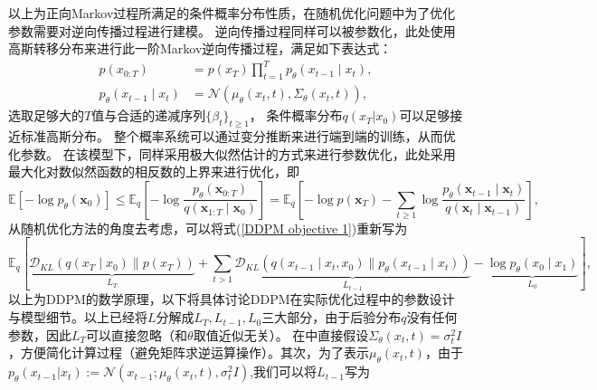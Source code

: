 以上为正向Markov过程所满足的条件概率分布性质，在随机优化问题中为了优化参数需要对逆向传播过程进行建模。
逆向传播过程同样可以被参数化，此处使用高斯转移分布来进行此一阶Markov逆向传播过程，满足如下表达式：
\begin{align}
    p\left(x_{0: T}\right)&=p\left(x_T\right) \prod_{t=1}^T p_\theta\left(x_{t-1} \mid x_t\right),\\
        p_\theta\left(x_{t-1} \mid x_t\right)&=\mathcal{N}\left(\mu_\theta\left(x_t, t\right), \Sigma_\theta\left(x_t, t\right)\right),
        \end{align}
选取足够大的$T$值与合适的递减序列$\{\beta_t\}_{t\geq 1}$， 条件概率分布$q(x_{T}|x_0)$可以足够接近标准高斯分布。
整个概率系统可以通过变分推断来进行端到端的训练，从而优化参数。
在该模型下，同样采用极大似然估计的方式来进行参数优化，此处采用最大化对数似然函数的相反数的上界来进行优化，即
\begin{equation}
    \mathbb{E}\left[-\log p_\theta\left(\mathbf{x}_0\right)\right] \leq \mathbb{E}_q\left[-\log \frac{p_\theta\left(\mathbf{x}_{0: T}\right)}{q\left(\mathbf{x}_{1: T} \mid \mathbf{x}_0\right)}\right]=\mathbb{E}_q\left[-\log p\left(\mathbf{x}_T\right)-\sum_{t \geq 1} \log \frac{p_\theta\left(\mathbf{x}_{t-1} \mid \mathbf{x}_t\right)}{q\left(\mathbf{x}_t \mid \mathbf{x}_{t-1}\right)}\right],
    \label{DDPM objective 1}
\end{equation}
从随机优化方法的角度去考虑，可以将式(\ref{DDPM objective 1})重新写为
\begin{equation}
\mathbb{E}_q[\underbrace{\mathcal{D}_{K L}\left(q\left(x_T \mid x_0\right) \| p\left(x_T\right)\right)}_{L_T}+\sum_{t>1} \underbrace{\mathcal{D}_{K L}\left(q\left(x_{t-1} \mid x_t, x_0\right) \| p_\theta\left(x_{t-1} \mid x_t\right)\right)}_{L_{t-1}}-\underbrace{\log p_\theta\left(x_0 \mid x_1\right)}_{L_0}],
    \end{equation}
以上为DDPM的数学原理，以下将具体讨论DDPM在实际优化过程中的参数设计与模型细节。以上已经将$L$分解成$L_T,L_{t-1},L_0$三大部分，由于后验分布$q$没有任何参数，因此$L_T$可以直接忽略（和$\theta$取值近似无关）。
在\cite{DDPM}中直接假设$\Sigma_{\theta}(x_t,t)=\sigma_t^2 I$，方便简化计算过程（避免矩阵求逆运算操作）。其次，为了表示$\mu_{\theta}(x_t,t)$，由于$p_{\theta}(x_{t-1}|x_t):= \mathcal{N}(x_{t-1};\mu_{\theta}(x_t,t),\sigma_t^2I)$,我们可以将$L_{t-1}$写为
